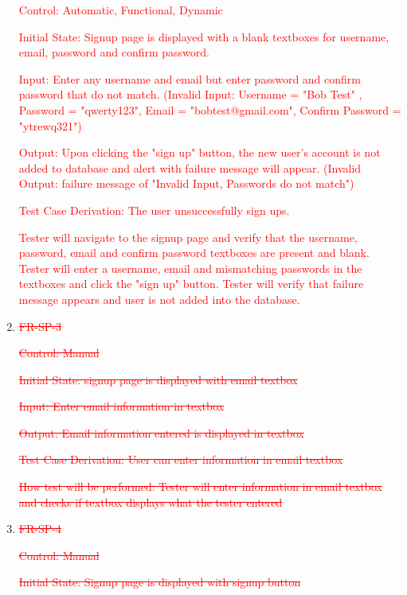 \documentclass[12pt, titlepage]{article}
\begin{document}
\begin{enumerate}
	\textcolor{red}{Control: Automatic, Functional, Dynamic}
	
	\textcolor{red}{Initial State: Signup page is displayed with a blank textboxes for username, email, password and confirm password.}
	
	\textcolor{red}{Input: Enter any username and email but enter password and confirm password that do not match. (Invalid Input: Username = "Bob Test" , Password = "qwerty123", Email = "bobtest@gmail.com", Confirm Password = "ytrewq321")}
	
	\textcolor{red}{Output: Upon clicking the "sign up" button, the new user's account is not added to database and alert with failure message will appear. (Invalid Output: failure message of "Invalid Input, Passwords do not match")}
	
	\textcolor{red}{Test Case Derivation: The user unsuccessfully sign ups.}
	
	\textcolor{red}{\textcolor{red}{Tester will navigate to the signup page and verify that the username, password, email and confirm password textboxes are present and blank. Tester will enter a username, email and mismatching passwords in the textboxes and click the "sign up" button. Tester will verify that failure message appears and user is not added into the database.}}
	
\item{\textcolor{red}{\sout{FR-SP-3}}}
	
\textcolor{red}{\sout{Control: Manual}}

\textcolor{red}{\sout{Initial State: signup page is displayed with email textbox}}

\textcolor{red}{\sout{Input: Enter email information in textbox}}

\textcolor{red}{\sout{Output: Email information entered is displayed in textbox}}

\textcolor{red}{\sout{Test Case Derivation: User can enter information in email textbox}}

\textcolor{red}{\sout{How test will be performed: Tester will enter information in email textbox and checks if textbox displays what the tester entered}}

\item{\textcolor{red}{\sout{FR-SP-4}}\\}

\textcolor{red}{\sout{Control: Manual}}

\textcolor{red}{\sout{Initial State: Signup page is displayed with signup button}}


\end{enumerate}
\end{document}
